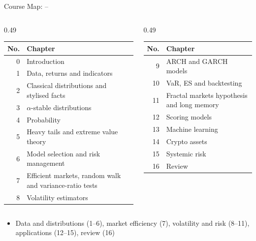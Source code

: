 \begin{frame}{Course Map: --}
\itemsize{\footnotesize}
\begin{columns}[T]
\begin{column}{0.49\textwidth}
\begin{center}
\footnotesize
\begin{tabular}{r>{\raggedright\arraybackslash}p{5.6cm}}
\toprule
\textbf{No.} & \textbf{Chapter} \\
\midrule
0 & Introduction \\
1 & Data, returns and indicators \\
2 & Classical distributions and stylised facts \\
3 & $\alpha$-stable distributions \\
4 & Probability \\
5 & Heavy tails and extreme value theory \\
6 & Model selection and risk management \\
7 & Efficient markets, random walk and variance-ratio tests \\
8 & Volatility estimators \\
\bottomrule
\end{tabular}
\end{center}

\end{column}
\begin{column}{0.49\textwidth}
\begin{center}
\footnotesize
\begin{tabular}{r>{\raggedright\arraybackslash}p{5.6cm}}
\toprule
\textbf{No.} & \textbf{Chapter} \\
\midrule
9 & ARCH and GARCH models \\
10 & VaR, ES and backtesting \\
11 & Fractal markets hypothesis and long memory \\
12 & Scoring models \\
13 & Machine learning \\
14 & Crypto assets \\
15 & Systemic risk \\
16 & Review \\
\bottomrule
\end{tabular}
\end{center}

\end{column}
\end{columns}
\begin{itemize}
    \item Data and distributions (1--6), market efficiency (7), volatility and risk (8--11), applications (12--15), review (16)
\end{itemize}
\end{frame}

